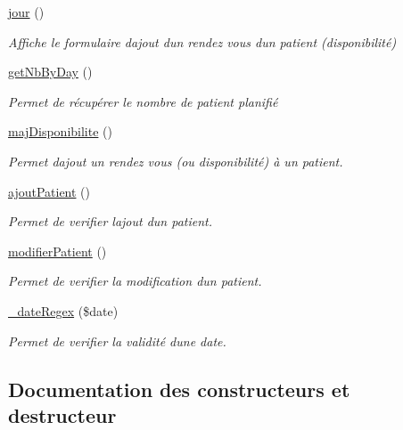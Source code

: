 \begin{DoxyCompactItemize}
\hyperlink{class_patient_a013e328ee230d66adc47dddbf997e3ec}{jour} ()
\begin{DoxyCompactList}\small\item\em Affiche le formulaire d\textquotesingle{}ajout d\textquotesingle{}un rendez vous d\textquotesingle{}un patient (disponibilité) \end{DoxyCompactList}\item 
\hyperlink{class_patient_a4c2082a23e84c8aa192640a1afd8e859}{get\+Nb\+By\+Day} ()
\begin{DoxyCompactList}\small\item\em Permet de récupérer le nombre de patient planifié \end{DoxyCompactList}\item 
\hyperlink{class_patient_a8add65878be9634fb8306905d46dc708}{maj\+Disponibilite} ()
\begin{DoxyCompactList}\small\item\em Permet d\textquotesingle{}ajout un rendez vous (ou disponibilité) à un patient. \end{DoxyCompactList}\item 
\hyperlink{class_patient_aa09ce2b06c4bfaaf967ecc57f385e81a}{ajout\+Patient} ()
\begin{DoxyCompactList}\small\item\em Permet de verifier l\textquotesingle{}ajout d\textquotesingle{}un patient. \end{DoxyCompactList}\item 
\hyperlink{class_patient_a0452dd4c6e851e05c7e5d39e78469111}{modifier\+Patient} ()
\begin{DoxyCompactList}\small\item\em Permet de verifier la modification d\textquotesingle{}un patient. \end{DoxyCompactList}\item 
\hyperlink{class_patient_ae3f3a76e0ee807571427204dc0150256}{\+\_\+date\+Regex} (\$date)
\begin{DoxyCompactList}\small\item\em Permet de verifier la validité d\textquotesingle{}une date. \end{DoxyCompactList}\end{DoxyCompactItemize}


\subsection{Documentation des constructeurs et destructeur}
\mbox{\label{class_patient_a253a158c107bee31fa35a99ebf9c7328}} 
